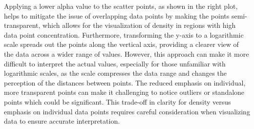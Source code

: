 Applying a lower alpha value to the scatter points, as shown in the right plot, helps to mitigate the issue of overlapping data points by making the points semi-transparent, which allows for the visualization of density in regions with high data point concentration. Furthermore, transforming the y-axis to a logarithmic scale spreads out the points along the vertical axis, providing a clearer view of the data across a wider range of values. However, this approach can make it more difficult to interpret the actual values, especially for those unfamiliar with logarithmic scales, as the scale compresses the data range and changes the perception of the distances between points. The reduced emphasis on individual, more transparent points can make it challenging to notice outliers or standalone points which could be significant. This trade-off in clarity for density versus emphasis on individual data points requires careful consideration when visualizing data to ensure accurate interpretation.